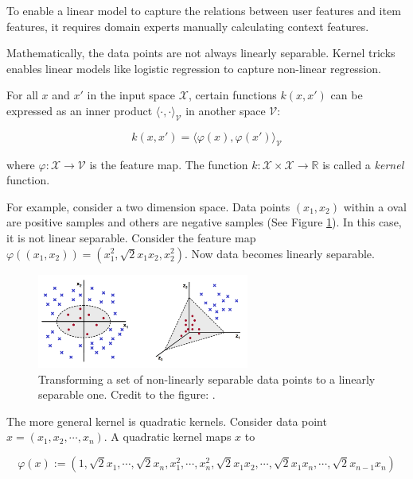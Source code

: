         To enable a linear model to capture the relations between user features and item features,
        it requires domain experts manually calculating context features.

        Mathematically, the data points are not always linearly separable.
        Kernel tricks enables linear models like logistic regression to capture non-linear regression.

        For all $x$ and $x'$ in the input space $\mathcal{X}$,
        certain functions $k(x, x')$ can be expressed as an inner product $\langle\cdot,\cdot\rangle_{\mathcal{V}}$
        in another space $\mathcal{V}$:

        \[
        k(x, x') = \langle \varphi(x), \varphi(x') \rangle_{\mathcal{V}}
        \]

        where $\varphi: \mathcal{X} \rightarrow \mathcal{V}$ is the feature map.
        The function $k: \mathcal{X} \times \mathcal{X} \rightarrow \mathbb{R}$ is called a \emph{kernel} function.

        For example, consider a two dimension space.
        Data points $(x_1, x_2)$ within a oval are positive samples and others are negative samples
        (See Figure \ref{fig:kernel-tricks}).
        In this case, it is not linear separable.
        Consider the feature map $\varphi((x_1, x_2)) = (x_1^2, \sqrt{2}x_1x_2, x_2^2)$.
        Now data becomes linearly separable. \cite{Rai2011}

        \begin{figure}[!htp]
            \centering
            \includegraphics[width=0.62\textwidth]{img/kernel-tricks.png}
            \caption{Transforming a set of non-linearly separable data points to a linearly separable one.
                Credit to the figure: \textcite{Rai2011}.}
            \label{fig:kernel-tricks}
        \end{figure}

        The more general kernel is quadratic kernels.
        Consider data point $x = (x_1, x_2, \cdots, x_n)$.
        A quadratic kernel maps $x$ to 

        \[
        \varphi(x) := (1, \sqrt{2}x_1, \cdots, \sqrt{2}x_n, x_1^2, \cdots, x_n^2,
          \sqrt{2}x_1x_2, \cdots, \sqrt{2}x_1x_n, \cdots, \sqrt{2}x_{n-1}x_n)
        \]

